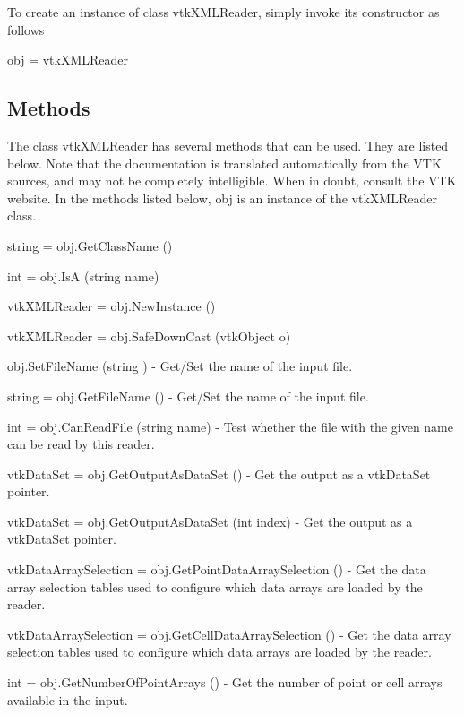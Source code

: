 To create an instance of class vtk\-X\-M\-L\-Reader, simply invoke its constructor as follows \begin{DoxyVerb}  obj = vtkXMLReader
\end{DoxyVerb}
 \hypertarget{vtkwidgets_vtkxyplotwidget_Methods}{}\subsection{Methods}\label{vtkwidgets_vtkxyplotwidget_Methods}
The class vtk\-X\-M\-L\-Reader has several methods that can be used. They are listed below. Note that the documentation is translated automatically from the V\-T\-K sources, and may not be completely intelligible. When in doubt, consult the V\-T\-K website. In the methods listed below, {\ttfamily obj} is an instance of the vtk\-X\-M\-L\-Reader class. 
\begin{DoxyItemize}
\item {\ttfamily string = obj.\-Get\-Class\-Name ()}  
\item {\ttfamily int = obj.\-Is\-A (string name)}  
\item {\ttfamily vtk\-X\-M\-L\-Reader = obj.\-New\-Instance ()}  
\item {\ttfamily vtk\-X\-M\-L\-Reader = obj.\-Safe\-Down\-Cast (vtk\-Object o)}  
\item {\ttfamily obj.\-Set\-File\-Name (string )} -\/ Get/\-Set the name of the input file.  
\item {\ttfamily string = obj.\-Get\-File\-Name ()} -\/ Get/\-Set the name of the input file.  
\item {\ttfamily int = obj.\-Can\-Read\-File (string name)} -\/ Test whether the file with the given name can be read by this reader.  
\item {\ttfamily vtk\-Data\-Set = obj.\-Get\-Output\-As\-Data\-Set ()} -\/ Get the output as a vtk\-Data\-Set pointer.  
\item {\ttfamily vtk\-Data\-Set = obj.\-Get\-Output\-As\-Data\-Set (int index)} -\/ Get the output as a vtk\-Data\-Set pointer.  
\item {\ttfamily vtk\-Data\-Array\-Selection = obj.\-Get\-Point\-Data\-Array\-Selection ()} -\/ Get the data array selection tables used to configure which data arrays are loaded by the reader.  
\item {\ttfamily vtk\-Data\-Array\-Selection = obj.\-Get\-Cell\-Data\-Array\-Selection ()} -\/ Get the data array selection tables used to configure which data arrays are loaded by the reader.  
\item {\ttfamily int = obj.\-Get\-Number\-Of\-Point\-Arrays ()} -\/ Get the number of point or cell arrays available in the input.  

\end{DoxyItemize}
